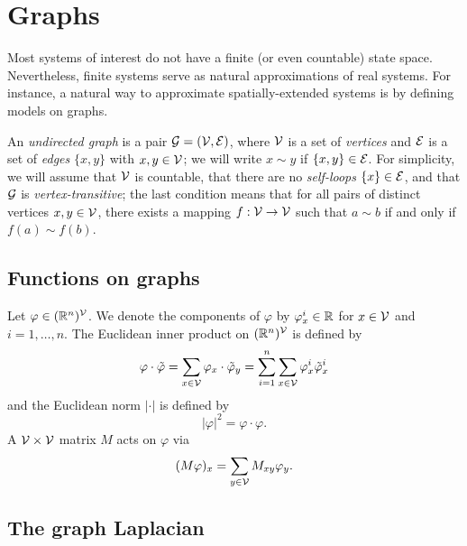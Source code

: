 \section{Graphs}

Most systems of interest do not have a finite (or even countable) state space. Nevertheless, finite systems serve as natural approximations of real systems. For instance, a natural way to approximate spatially-extended systems is by defining models on graphs.

An \emph{undirected graph} is a pair $\mathcal{G} = (\mathcal{V}, \mathcal{E})$, where $\mathcal{V}$
is a set of \emph{vertices} and $\mathcal{E}$ is a set of
\emph{edges} $\{ x, y \}$ with $x, y \in \mathcal{V}$; we will write $x \sim y$ if
$\{ x, y \} \in \mathcal{E}$.
For simplicity, we will assume that $\mathcal{V}$ is countable, that there are no
\emph{self-loops} $\{ x \} \in \mathcal{E}$, and that $\mathcal{G}$ is \emph{vertex-transitive};
the last condition means that for all pairs of distinct vertices $x, y \in \mathcal{V}$,
there exists a mapping $f : \mathcal{V} \rightarrow \mathcal{V}$ such that $a \sim b$ if and only
if $f(a) \sim f(b)$.


\subsection{Functions on graphs}

Let $\varphi \in ({\mathbb R}^n)^{\mathcal{V}}$. We denote the components of $\varphi$ by
$\varphi^i_x \in {\mathbb R}$ for $x \in \mathcal{V}$ and $i = 1, \ldots, n$. The Euclidean inner product on $({\mathbb R}^n)^{\mathcal{V}}$ is defined by
\begin{equation}
\varphi\cdot\tilde\varphi
  =
\sum_{x\in\mathcal{V}} \varphi_x \cdot \tilde\varphi_y
  =
\sum_{i=1}^n \sum_{x\in\mathcal{V}} \varphi^i_x \tilde\varphi^i_x
\end{equation}
and the Euclidean norm $|\cdot|$ is defined by
\begin{equation}
|\varphi|^2 = \varphi \cdot \varphi.
\end{equation}
A $\mathcal{V}\times\mathcal{V}$ matrix $M$ acts on $\varphi$ via
\begin{equation}
(M \varphi)_x = \sum_{y\in\mathcal{V}} M_{xy} \varphi_y.
\end{equation}


\subsection{The graph Laplacian}

